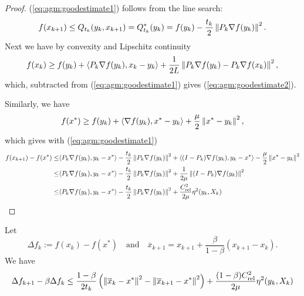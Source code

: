 %
\begin{proof}
(\ref{eq:agm:goodestimate1}) follows from the line search:
%
\begin{align*}
f(x_{k+1}) \le Q_{t_k}(y_k,x_{k+1}) = Q^*_{t_k}(y_k) = f(y_k)- \frac{t_k}{2}\left\|P_{k}\nabla f(y_k)\right\|^2.
\end{align*}
%
Next we have by convexity and Lipschitz continuity
%
\begin{align*}
f(x_k) \ge f(y_k) + \langle P_k\nabla f(y_k),x_k-y_k\rangle + \frac{1}{2L}\left\|P_k\nabla f(y_k)-P_k\nabla f(x_k)\right\|^2,
\end{align*}
%
which, subtracted from (\ref{eq:agm:goodestimate1}) gives (\ref{eq:agm:goodestimate2}).

Similarly, we have
%
\begin{align*}
f(x^*) \ge f(y_k) + \langle\nabla f(y_k),x^*-y_k\rangle + \frac{\mu}{2}\left\|x^*-y_k\right\|^2,
\end{align*}
%
which gives with (\ref{eq:agm:goodestimate1})
%
\begin{align*}
f(x_{k+1}) - f(x^*) \le& \langle P_k\nabla f(y_k),y_k-x^*\rangle- \frac{t_k}{2}\left\|P_{k}\nabla f(y_k)\right\|^2
+ \langle(I-P_k)\nabla f(y_k),y_k-x^*\rangle-\frac{\mu}{2}\left\|x^*-y_k\right\|^2\\
\le&\langle P_k\nabla f(y_k),y_k-x^*\rangle- \frac{t_k}{2}\left\|P_{k}\nabla f(y_k)\right\|^2
+ \frac{1}{2\mu}\left\|(I-P_k)\nabla f(y_k)\right\|^2\\
\le&\langle P_k\nabla f(y_k),y_k-x^*\rangle- \frac{t_k}{2}\left\|P_{k}\nabla f(y_k)\right\|^2
+ \frac{C_{\rm rel}^2}{2\mu}\eta^2(y_k,X_k)
\end{align*}
%
\end{proof}
%
\begin{lemma}\label{lemma:}
Let 
%
\begin{equation}\label{eq:}
\Delta f_k := f(x_k)-f(x^*) \quad\mbox{and}\quad \overline{x}_{k+1} =  x_{k+1}+\frac{\beta}{1-\beta} (x_{k+1}-x_k).
\end{equation}
%
We have
%
\begin{equation}\label{eq:}
\Delta f_{k+1} - \beta\Delta f_{k} \le \frac{1-\beta}{2t_k} \left( \left\|\overline{x}_{k}-x^*\right\|^2 - \left\|\overline{x}_{k+1}-x^*\right\|^2\right) + \frac{(1-\beta)C_{\rm rel}^2}{2\mu}\eta^2(y_k,X_k)
\end{equation}
%
\end{lemma}
%
